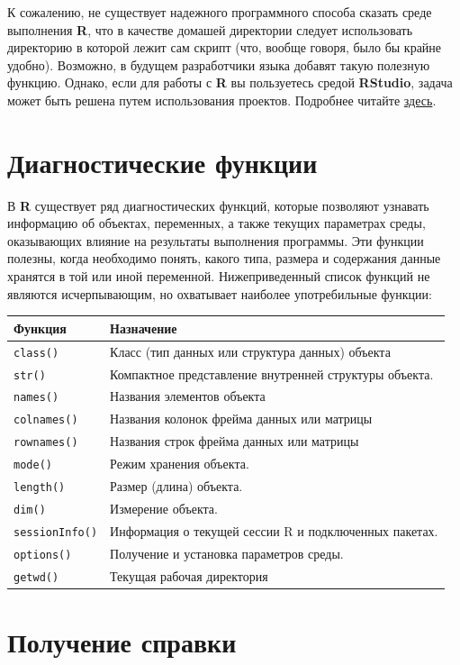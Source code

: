 \documentclass[]{book}
\begin{document}
К сожалению, не существует надежного программного способа сказать среде
выполнения \textbf{R}, что в качестве домашей директории следует
использовать директорию в которой лежит сам скрипт (что, вообще говоря,
было бы крайне удобно). Возможно, в будущем разработчики языка добавят
такую полезную функцию. Однако, если для работы с \textbf{R} вы
пользуетесь средой \textbf{RStudio}, задача может быть решена путем
использования проектов. Подробнее читайте
\href{https://support.rstudio.com/hc/en-us/articles/200526207-Using-Projects}{здесь}.

\section*{Диагностические функции}\label{-}

В \textbf{R} существует ряд диагностических функций, которые позволяют
узнавать информацию об объектах, переменных, а также текущих параметрах
среды, оказывающих влияние на результаты выполнения программы. Эти
функции полезны, когда необходимо понять, какого типа, размера и
содержания данные хранятся в той или иной переменной. Нижеприведенный
список функций не являются исчерпывающим, но охватывает наиболее
употребильные функции:

\begin{longtable}[]{@{}ll@{}}
\toprule
Функция & Назначение\tabularnewline
\midrule
\endhead
\texttt{class()} & Класс (тип данных или структура данных)
объекта\tabularnewline
\texttt{str()} & Компактное представление внутренней структуры
объекта.\tabularnewline
\texttt{names()} & Названия элементов объекта\tabularnewline
\texttt{colnames()} & Названия колонок фрейма данных или
матрицы\tabularnewline
\texttt{rownames()} & Названия строк фрейма данных или
матрицы\tabularnewline
\texttt{mode()} & Режим хранения объекта.\tabularnewline
\texttt{length()} & Размер (длина) объекта.\tabularnewline
\texttt{dim()} & Измерение объекта.\tabularnewline
\texttt{sessionInfo()} & Информация о текущей сессии R и подключенных
пакетах.\tabularnewline
\texttt{options()} & Получение и установка параметров
среды.\tabularnewline
\texttt{getwd()} & Текущая рабочая директория\tabularnewline
\bottomrule
\end{longtable}

\section*{Получение справки}\label{-}
\end{document}
